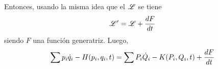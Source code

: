 \documentclass[10pt,oneside]{CBFT_book}
\begin{document}
Entonces, usando la misma idea que el $\mathscr{L}$ se tiene 
\[
	\mathscr{L}' = \mathscr{L} + \frac{dF}{dt}
\]
siendo $F$ una función generatriz. Luego,
\[
	\sum p_i \dot{q}_i - H(p_i,q_i,t) = \sum P_i\dot{Q}_i - K(P_i,Q_i,t) + \frac{d^{\hspace{-0.05em}} {F}}{d {t}^{\hspace{-0.05em}}}
\]









\end{document}
